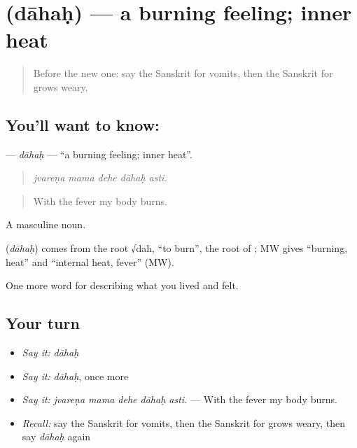 \section[\texorpdfstring{\sk{दाहः} (dāhaḥ)}{दाहः (dāhaḥ)}]{ (dāhaḥ) — a burning feeling; inner heat}

\label{lesson:SA-C477-dahah}



\begin{quote}
Before the new one: say the Sanskrit for vomits, then the Sanskrit for grows weary.
\end{quote}

\subsection*{You'll want to know: }
\textbf{} — \emph{dāhaḥ} — \textquotedblleft{}a burning feeling; inner heat\textquotedblright{}.

\begin{quote}
    
\end{quote}

\begin{quote}
\emph{jvareṇa mama dehe dāhaḥ asti.}
\end{quote}

\begin{quote}
With the fever my body burns.
\end{quote}

A masculine noun.

\begin{cousinweb}
\textbf{} (\emph{dāhaḥ}) comes from the root √dah, \textquotedblleft{}to burn\textquotedblright{}, the root of \textbf{}; MW gives \textquotedblleft{}burning, heat\textquotedblright{} and \textquotedblleft{}internal heat, fever\textquotedblright{} (MW).
\end{cousinweb}

\begin{grammarlens}[title={What you've built}]
One more word for describing what you lived and felt.
\end{grammarlens}

\subsection*{Your turn}
\begin{itemize}
\raggedright
  \item \emph{Say it:} \emph{dāhaḥ}
  \item \emph{Say it:} \emph{dāhaḥ}, once more
  \item \emph{Say it:} \emph{jvareṇa mama dehe dāhaḥ asti.} — With the fever my body burns.
  \item \emph{Recall:} say the Sanskrit for vomits, then the Sanskrit for grows weary, then say \emph{dāhaḥ} again
\end{itemize}

